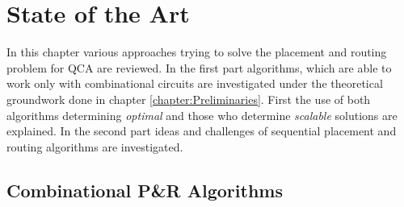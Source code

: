 \chapter{State of the Art}\label{chapter:SotA}
In this chapter various approaches trying to solve the placement and routing problem for QCA are reviewed. In the first part algorithms, which are able to work only with combinational circuits are investigated under the theoretical groundwork done in chapter \ref{chapter:Preliminaries}. First the use of both algorithms determining \textit{optimal} and those who determine \textit{scalable} solutions are explained. In the second part ideas and challenges of sequential placement and routing algorithms are investigated.

\section{Combinational P\&R Algorithms}
